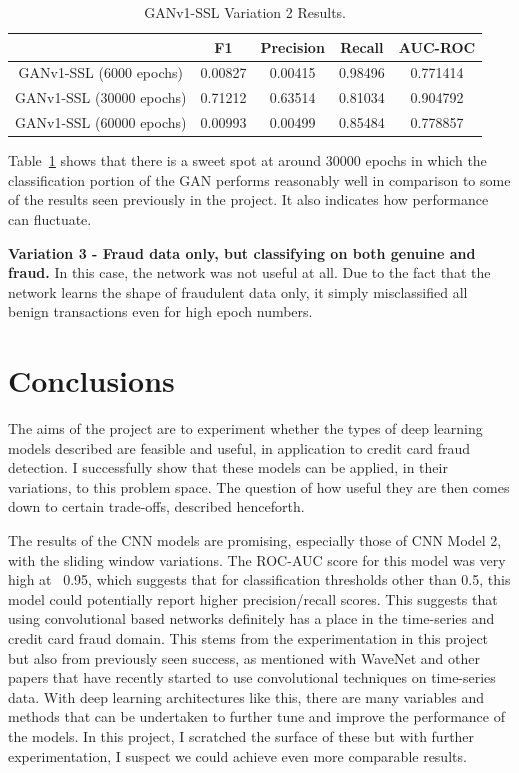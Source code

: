 \documentclass[12pt,a4paper,twoside]{report}
\begin{document}
\begin{table}[H]  
  \centering
  \begin{tabular}{ccccc}
    \toprule
           		& F1 & Precision & Recall & AUC-ROC \\ \midrule
    GANv1-SSL (6000 epochs) & 0.00827  &  0.00415 & 0.98496  & 0.771414 \\
    GANv1-SSL (30000 epochs) & 0.71212  &  0.63514 & 0.81034  & 0.904792 \\
    GANv1-SSL (60000 epochs) & 0.00993   &   0.00499 & 0.85484 & 0.778857  \\
   
   \bottomrule
 \end{tabular}
 \caption{GANv1-SSL Variation 2 Results.}
\label{table:ganv1-ssl-halfhalf}
\end{table}

Table~\ref{table:ganv1-ssl-halfhalf} shows that there is a sweet spot at around 30000 epochs in which the classification portion of the GAN performs reasonably well in comparison to some of the results seen previously in the project. It also indicates how performance can fluctuate. 

\textbf{Variation 3 - Fraud data only, but classifying on both genuine and fraud.}
In this case, the network was not useful at all. Due to the fact that the network learns the shape of fraudulent data only, it simply misclassified all benign transactions even for high epoch numbers. 


\chapter{Conclusions}

The aims of the project are to experiment whether the types of deep learning models described are feasible and useful, in application to credit card fraud detection. I successfully show that these models can be applied, in their variations, to this problem space. The question of how useful they are then comes down to certain trade-offs, described henceforth.

The results of the CNN models are promising, especially those of CNN Model 2, with the sliding window variations. The ROC-AUC score for this model was very high at ~0.95, which suggests that for classification thresholds other than 0.5, this model could potentially report higher precision/recall scores. This suggests that using convolutional based networks definitely has a place in the time-series and credit card fraud domain. This stems from the experimentation in this project but also from previously seen success, as mentioned with WaveNet and other papers that have recently started to use convolutional techniques on time-series data. With deep learning architectures like this, there are many variables and methods that can be undertaken to further tune and improve the performance of the models. In this project, I scratched the surface of these but with further experimentation, I suspect we could achieve even more comparable results. 
\end{document}
